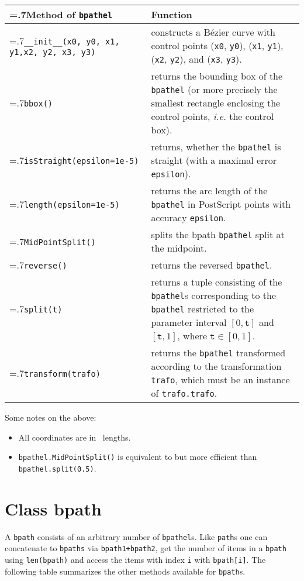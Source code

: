 \medskip
\begin{tabularx}{\linewidth}{>{\hsize=.7\hsize}X>{\raggedright\arraybackslash\hsize=1.3\hsize}X}
  Method of \texttt{bpathel} & Function \\
  \hline 
  \texttt{\_\_init\_\_(x0, y0, x1, y1,\newline\phantom{\_\_init\_\_(}x2, y2, x3, y3)} &
  constructs a B\'ezier curve with control points (\texttt{x0},
  \texttt{y0}), (\texttt{x1}, \texttt{y1}), (\texttt{x2},
  \texttt{y2}),
  and (\texttt{x3}, \texttt{y3}).\\
  \texttt{bbox()} & returns the bounding box of the \texttt{bpathel}
  (or more precisely the smallest rectangle enclosing the control
  points,
  \textit{i.e.} the control box).\\
  \texttt{isStraight(epsilon=1e-5)} & returns, whether the
  \texttt{bpathel} is straight (with a maximal error
  \texttt{epsilon}).\\
  \texttt{length(epsilon=1e-5)} & returns the arc length of the \texttt{bpathel} in
  PostScript points with accuracy \texttt{epsilon}. \\
  \texttt{MidPointSplit()} & splits the bpath
  \texttt{bpathel} split at the midpoint.\\
  \texttt{reverse()} & returns the reversed \texttt{bpathel}.\\
  \texttt{split(t)} & returns a tuple consisting of the
  \texttt{bpathel}s corresponding to the \texttt{bpathel} restricted to
  the parameter interval
  $[0,\mathtt{t}]$ and $[\mathtt{t},1]$, where $\mathtt{t}\in[0,1]$.\\
  \texttt{transform(trafo)} & returns the \texttt{bpathel}
  transformed according to the transformation \texttt{trafo}, which
  must be an instance of
  \texttt{trafo.trafo}.
\end{tabularx}
\medskip

Some notes on the above:
\begin{itemize}
\item All coordinates are in \PyX\ lengths.
\item \verb|bpathel.MidPointSplit()| is equivalent to but more
  efficient than \verb|bpathel.split(0.5)|.
\end{itemize}


\section{Class bpath}

A \verb|bpath| consists of an arbitrary number of
\verb|bpathel|s. Like \verb|path|s one can concatenate to
\verb|bpaths| via \verb|bpath1+bpath2|, get the number of items in a
\verb|bpath| using \verb|len(bpath)| and access the items with index
\verb|i| with \verb|bpath[i]|. The following table summarizes the
other methods available for \verb|bpath|s.

